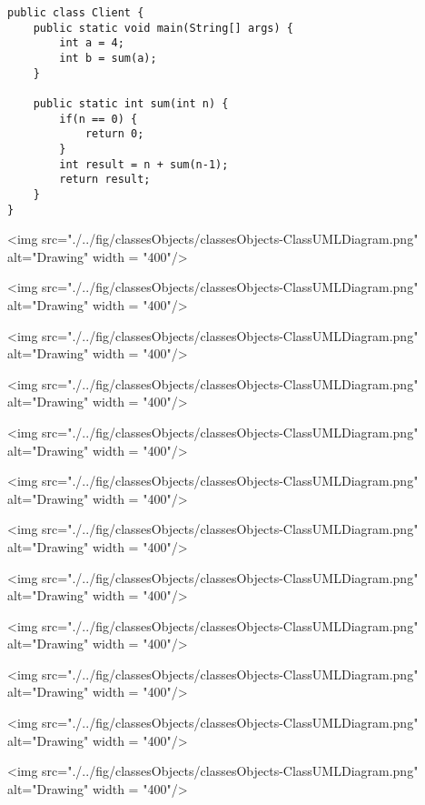 \begin{lstlisting}
public class Client {
	public static void main(String[] args) {
		int a = 4;
		int b = sum(a);
	}
	
	public static int sum(int n) {
		if(n == 0) {
			return 0;
		}
		int result = n + sum(n-1);
		return result;
	}
}
\end{lstlisting}

\newpage

<img src="./../fig/classesObjects/classesObjects-ClassUMLDiagram.png" alt="Drawing" width = "400"/>
\vskip0.6cm

<img src="./../fig/classesObjects/classesObjects-ClassUMLDiagram.png" alt="Drawing" width = "400"/>

\vskip0.6cm

<img src="./../fig/classesObjects/classesObjects-ClassUMLDiagram.png" alt="Drawing" width = "400"/>

\vskip0.6cm

<img src="./../fig/classesObjects/classesObjects-ClassUMLDiagram.png" alt="Drawing" width = "400"/>

\vskip0.6cm

<img src="./../fig/classesObjects/classesObjects-ClassUMLDiagram.png" alt="Drawing" width = "400"/>

\vskip0.6cm

<img src="./../fig/classesObjects/classesObjects-ClassUMLDiagram.png" alt="Drawing" width = "400"/>

\vskip0.6cm

<img src="./../fig/classesObjects/classesObjects-ClassUMLDiagram.png" alt="Drawing" width = "400"/>

\vskip0.6cm

<img src="./../fig/classesObjects/classesObjects-ClassUMLDiagram.png" alt="Drawing" width = "400"/>

\vskip0.6cm

<img src="./../fig/classesObjects/classesObjects-ClassUMLDiagram.png" alt="Drawing" width = "400"/>

\vskip0.6cm

<img src="./../fig/classesObjects/classesObjects-ClassUMLDiagram.png" alt="Drawing" width = "400"/>

\vskip0.6cm

<img src="./../fig/classesObjects/classesObjects-ClassUMLDiagram.png" alt="Drawing" width = "400"/>

\vskip0.6cm

<img src="./../fig/classesObjects/classesObjects-ClassUMLDiagram.png" alt="Drawing" width = "400"/>


